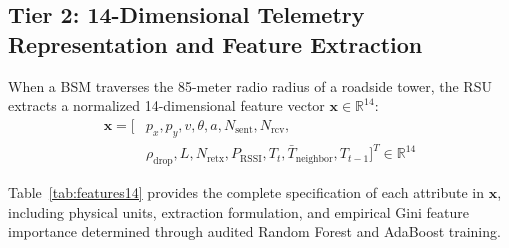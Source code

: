 \documentclass[conference]{IEEEtran}
\begin{document}
\subsection{Tier 2: 14-Dimensional Telemetry Representation and Feature Extraction}

When a BSM traverses the 85-meter radio radius of a roadside tower, the RSU extracts a normalized 14-dimensional feature vector $\mathbf{x} \in \mathbb{R}^{14}$:
\begin{equation}
\begin{split}
\mathbf{x} = [ & p_x, p_y, v, \theta, a, N_{\text{sent}}, N_{\text{rcv}}, \\
& \rho_{\text{drop}}, L, N_{\text{retx}}, P_{\text{RSSI}}, T_t, \bar{T}_{\text{neighbor}}, T_{t-1} ]^T \in \mathbb{R}^{14}
\end{split}
\label{eq:feature_vector}
\end{equation}

Table~\ref{tab:features14} provides the complete specification of each attribute in $\mathbf{x}$, including physical units, extraction formulation, and empirical Gini feature importance determined through audited Random Forest and AdaBoost training.
\end{document}
